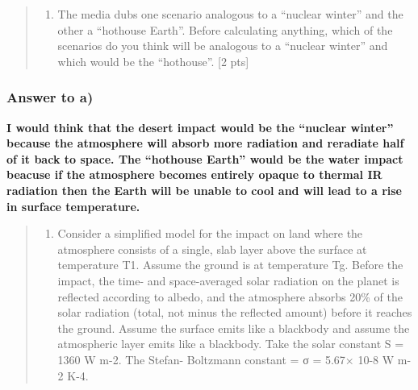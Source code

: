 \documentclass[11pt]{article}
\providecommand{\tightlist}{%
      \setlength{\itemsep}{0pt}\setlength{\parskip}{0pt}}
\begin{document}
\begin{quote}
\begin{enumerate}
\def\labelenumi{(\alph{enumi})}
\tightlist
\item
  The media dubs one scenario analogous to a ``nuclear winter'' and the
  other a ``hothouse Earth''. Before calculating anything, which of the
  scenarios do you think will be analogous to a ``nuclear winter'' and
  which would be the ``hothouse''. {[}2 pts{]}
\end{enumerate}
\end{quote}

\subsubsection{Answer to a)}\label{answer-to-a}

\textbf{I would think that the desert impact would be the ``nuclear
winter'' because the atmosphere will absorb more radiation and reradiate
half of it back to space. The ``hothouse Earth'' would be the water
impact beacuse if the atmosphere becomes entirely opaque to thermal IR
radiation then the Earth will be unable to cool and will lead to a rise
in surface temperature. }

\begin{quote}
\begin{enumerate}
\def\labelenumi{(\alph{enumi})}
\setcounter{enumi}{1}
\tightlist
\item
  Consider a simplified model for the impact on land where the
  atmosphere consists of a single, slab layer above the surface at
  temperature T1. Assume the ground is at temperature Tg. Before the
  impact, the time- and space-averaged solar radiation on the planet is
  reflected according to albedo, and the atmosphere absorbs 20\% of the
  solar radiation (total, not minus the reflected amount) before it
  reaches the ground. Assume the surface emits like a blackbody and
  assume the atmospheric layer emits like a blackbody. Take the solar
  constant S = 1360 W m-2. The Stefan- Boltzmann constant = σ = 5.67×
  10-8 W m-2 K-4.
\end{enumerate}
\end{quote}
\end{document}
